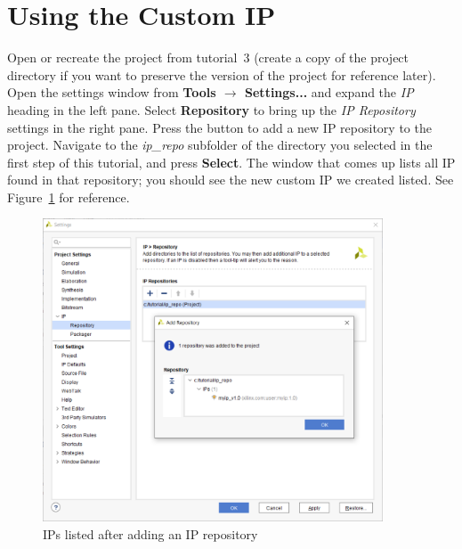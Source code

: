 \documentclass[11pt]{article}
\begin{document}
\section{Using the Custom IP}
\label{sec:using_ip}
Open or recreate the project from tutorial~3 (create a copy of the project directory if you want to preserve the version of the project for reference later). Open the settings window from \textbf{Tools $\rightarrow$ Settings...} and expand the \textit{IP} heading in the left pane. Select \textbf{Repository} to bring up the \textit{IP Repository} settings in the right pane. Press the 
button to add a new IP repository to the project. Navigate to the \textit{ip\_repo} subfolder of the directory you selected in the first step of this tutorial, and press \textbf{Select}. The window that comes up lists all IP found in that repository; you should see the new custom IP we created listed. See Figure~\ref{fig:ip_repo_added} for reference.

\begin{figure}[!h]
    \centering
    \includegraphics[width=0.9\textwidth]{images/ip_repo_added.png}
    \caption{IPs listed after adding an IP repository}
    \label{fig:ip_repo_added}
\end{figure}
\end{document}
